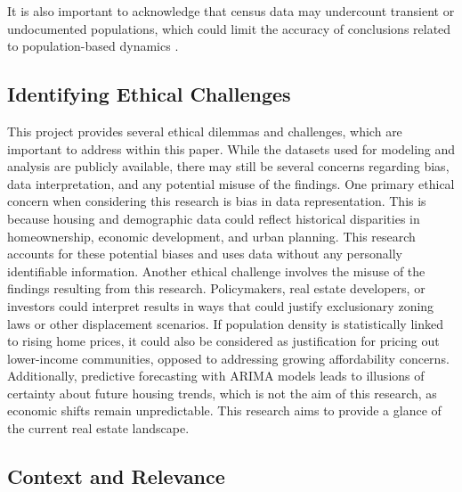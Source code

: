 \documentclass[journal,article,submit,pdftex,moreauthors]{Definitions/mdpi}
\begin{document}
It is also important to acknowledge that census data may undercount transient or undocumented populations, which could limit the accuracy of conclusions related to population-based dynamics \citep{cooper_2020_on}.

\subsection{Identifying Ethical Challenges}

This project provides several ethical dilemmas and challenges, which are important to address within this paper. While the datasets used for modeling and analysis are publicly available, there may still be several concerns regarding bias, data interpretation, and any potential misuse of the findings. One primary ethical concern when considering this research is bias in data representation. This is because housing and demographic data could reflect historical disparities in homeownership, economic development, and urban planning. This research accounts for these potential biases and uses data without any personally identifiable information. Another ethical challenge involves the misuse of the findings resulting from this research. Policymakers, real estate developers, or investors could interpret results in ways that could justify exclusionary zoning laws or other displacement scenarios. If population density is statistically linked to rising home prices, it could also be considered as justification for pricing out lower-income communities, opposed to addressing growing affordability concerns. Additionally, predictive forecasting with ARIMA models leads to illusions of certainty about future housing trends, which is not the aim of this research, as economic shifts remain unpredictable. This research aims to provide a glance of the current real estate landscape.

\subsection{Context and Relevance}
\end{document}
